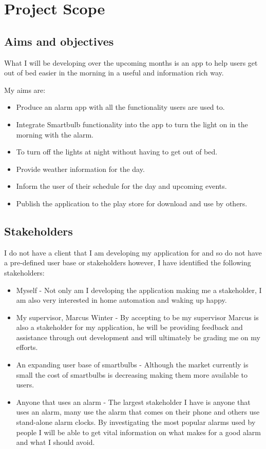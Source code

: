 \section{Project Scope}\label{project-scope}

\subsection{Aims and objectives}\label{aims-and-objectives}

What I will be developing over the upcoming months is an app to help
users get out of bed easier in the morning in a useful and information
rich way.

My aims are:

\begin{itemize}
\tightlist
\item
  Produce an alarm app with all the functionality users are used to.
\item
  Integrate Smartbulb functionality into the app to turn the light on in
  the morning with the alarm.
\item
  To turn off the lights at night without having to get out of bed.
\item
  Provide weather information for the day.
\item
  Inform the user of their schedule for the day and upcoming events.
\item
  Publish the application to the play store for download and use by
  others.
\end{itemize}

\subsection{Stakeholders}\label{stakeholders}

I do not have a client that I am developing my application for and so do
not have a pre-defined user base or stakeholders however, I have
identified the following stakeholders:

\begin{itemize}
\item
  Myself - Not only am I developing the application making me a
  stakeholder, I am also very interested in home automation and waking
  up happy.
\item
  My supervisor, Marcus Winter - By accepting to be my supervisor Marcus
  is also a stakeholder for my application, he will be providing
  feedback and assistance through out development and will ultimately be
  grading me on my efforts.
\item
  An expanding user base of smartbulbs - Although the market currently
  is small the cost of smartbulbs is decreasing making them more
  available to users.
\item
  Anyone that uses an alarm - The largest stakeholder I have is anyone
  that uses an alarm, many use the alarm that comes on their phone and
  others use stand-alone alarm clocks. By investigating the most popular
  alarms used by people I will be able to get vital information on what
  makes for a good alarm and what I should avoid.
\end{itemize}

